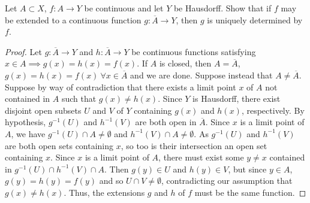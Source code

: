 \begin{exercise}[ID=2.18.13]
    Let $A \subset X$, $f: A \rightarrow Y$ be continuous and let $Y$ be Hausdorff.
    Show that if $f$ may be extended to a continuous function $g: \overline{A} \rightarrow Y$, then $g$ is uniquely determined by $f$.
\end{exercise}

\begin{solution}
    \begin{proof}
        Let $g: \overline{A} \rightarrow Y$ and $h: \overline{A} \rightarrow Y$ be continuous functions satisfying $x \in A \implies g(x) = h(x) = f(x)$.
        If $A$ is closed, then $A = \overline{A}$, $g(x) = h(x) = f(x)~ \forall x \in \overline{A}$ and we are done.
        Suppose instead that $A \neq \overline{A}$.
        Suppose by way of contradiction that there exists a limit point $x$ of $A$ not contained in $A$ such that $g(x) \neq h(x)$.
        Since $Y$ is Hausdorff, there exist disjoint open subsets $U$ and $V$ of $Y$ containing $g(x)$ and $h(x)$, respectively.
        By hypothesis, $g^{-1}(U)$ and $h^{-1}(V)$ are both open in $\overline{A}$.
        Since $x$ is a limit point of $A$, we have $g^{-1}(U) \cap A \neq \emptyset$ and $h^{-1}(V) \cap A \neq \emptyset$.
        As $g^{-1}(U)$ and $h^{-1}(V)$ are both open sets containing $x$, so too is their intersection an open set containing $x$.
        Since $x$ is a limit point of $A$, there must exist some $y \neq x$ contained in $g^{-1}(U) \cap h^{-1}(V) \cap A$.
        Then $g(y) \in U$ and $h(y) \in V$, but since $y \in A$, $g(y) = h(y) = f(y)$ and so $U \cap V \neq \emptyset$, contradicting our assumption that $g(x) \neq h(x)$.
        Thus, the extensions $g$ and $h$ of $f$ must be the same function.
    \end{proof}
\end{solution}
\newpage
